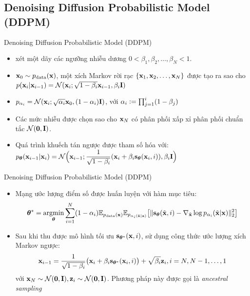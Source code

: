 \documentclass[10pt]{beamer}
\theoremstyle{remark}
\numberwithin{algocf}{section}
\numberwithin{equation}{section}
\numberwithin{dl}{section}
\numberwithin{figure}{section}
\begin{document}
\subsection{Denoising Diffusion Probabilistic Model (DDPM)}

\begin{frame}{Denoising Diffusion Probabilistic Model (DDPM)}
	\begin{itemize}
		\item \citep{sohl2015deep,ho2020denoising} xét một dãy các ngưỡng nhiễu dương $0 < \beta_1, \beta_2, \dots, \beta_N < 1$.
		\item $\bold{x}_0 \sim p_{\mathrm{data}}(\bold{x})$, một xích Markov rời rạc $\lbrace \bold{x}_1, \bold{x}_2, \dots, \bold{x}_N \rbrace$ được tạo ra sao cho $p(\bold{x}_i \vert \bold{x}_{i-1}) = \mathcal{N}(\bold{x}_i; \sqrt{1-\beta_i} \bold{x}_{i-1}, \beta_i \bold{I})$
		\item $p_{\alpha_i}=\mathcal{N}(\bold{x}_i; \sqrt{\alpha_i}\bold{x}_0, (1-\alpha_i)\bold{I})$,
		với $\alpha_i \vcentcolon = \prod_{j=1}^i (1 - \beta_j)$
		\item Các mức nhiễu được chọn sao cho $\bold{x}_N$ có phân phối xấp xỉ phân phối chuẩn tắc $\mathcal{N}(\bold{0}, \bold{I})$.
		\item Quá trình khuếch tán ngược được tham số hóa với: $p_{\boldsymbol{\theta}} (\bold{x}_{i-1} \vert \bold{x}_i)=\mathcal{N}\Big(\bold{x}_{i-1}; \dfrac{1}{\sqrt{1-\beta_i}}(\bold{x}_i + \beta_i \bold{s}_{\boldsymbol{\theta}}(\bold{x}_i, i)), \beta_i \bold{I}\Big)$
		
	\end{itemize}
\end{frame}

\begin{frame}{Denoising Diffusion Probabilistic Model (DDPM)}
	\begin{itemize}
		\item Mạng ước lượng điểm số được huấn luyện với hàm mục tiêu:
		\begin{equation} \label{eq:3}
			\boldsymbol{\theta}^{\ast} = \underset{\boldsymbol{\theta}}{\mathrm{argmin}} \sum_{i=1}^N (1 - \alpha_i) \mathbb{E}_{p_{\mathrm{data}}(\bold{x})} \mathbb{E}_{p_{\alpha_i (\tilde{\bold{x}} \vert \bold{x})}} \big \lbrack \lVert \bold{s}_{\boldsymbol{\theta}} (\tilde{\bold{x}}, i) - \nabla_{\tilde{\bold{x}}} \log p_{\alpha_i} (\tilde{\bold{x}} \vert \bold{x}) \rVert_2^2 \big \rbrack
		\end{equation}
		\item Sau khi thu được mô hình tối ưu $\bold{s}_{\boldsymbol{\theta}^{\ast}}(\bold{x}, i)$, sử dụng công thức ước lượng xích Markov ngược:
		\begin{equation} \label{eq:4}
			\bold{x}_{i-1} = \dfrac{1}{\sqrt{1-\beta_i}} \big( \bold{x}_i + \beta_i \bold{s}_{\boldsymbol{\theta}^{\ast}} (\bold{x}_i, i) \big) + \sqrt{\beta_i} \bold{z}_i, i = N, N-1, \dots, 1
		\end{equation}
		với $\bold{x}_N \sim \mathcal{N}(\bold{0}, \bold{I}), \bold{z}_i \sim \mathcal{N}(\bold{0}, \bold{I})$. Phương pháp này được gọi là \textit{ancestral sampling}
	\end{itemize}
\end{frame}
\end{document}
